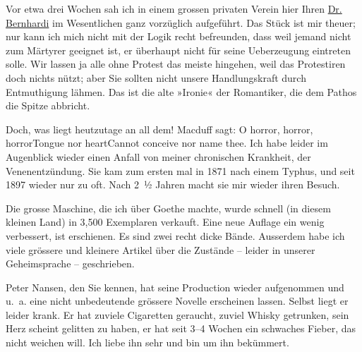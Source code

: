 \pstart
           Vor etwa drei Wochen sah ich in {\pb}einem grossen privaten Verein hier Ihren \uline{Dr. Bernhardi} im Wesentlichen ganz vorzüglich aufgeführt. Das Stück ist mir theuer; nur kann
               ich mich nicht mit der Logik recht befreunden, dass weil jemand nicht zum Märtyrer
               geeignet ist, er überhaupt nicht für seine Ueberzeugung eintreten solle. Wir lassen
               ja alle ohne Protest das meiste hingehen, weil das Protestiren doch nichts nützt;
               aber Sie sollten nicht unsere Handlungskraft durch Entmuthigung lähmen. Das ist die
               alte »Ironie« der Romantiker, die dem Pathos die Spitze abbricht.\pend
           
\pstart
           Doch, was liegt heutzutage an all dem! Macduff sagt:\pend
           \stanza{}O horror, horror, horrorTongue nor heartCannot conceive nor name
                     thee.\stanzaend{}
\pstart
           {\pb}Ich habe leider im Augenblick
               wieder einen Anfall von meiner chronischen Krankheit, der Venenentzündung. Sie kam
               zum ersten mal in 1871 nach einem Typhus, und seit 1897
               wieder nur zu oft. Nach 2 ½ Jahren macht sie mir wieder ihren Besuch.\pend
           
\pstart
           Die grosse Maschine, die ich
               über Goethe machte, wurde schnell (in diesem
               kleinen Land) in 3,500
               Exemplaren verkauft. Eine neue Auflage ein wenig verbessert, ist erschienen. Es sind
               zwei recht dicke Bände. Ausserdem habe ich viele grössere und kleinere Artikel über
               die Zustände – leider in unserer Geheimsprache – geschrieben.\pend
           
\pstart
           Peter Nansen, den Sie kennen, hat seine
               Production wieder aufgenommen und u. a. eine nicht unbedeutende grössere Novelle erscheinen lassen.
               Selbst liegt er leider krank. Er hat zuviele {\pb}Cigaretten geraucht, zuviel Whisky
               getrunken, sein Herz scheint gelitten zu haben, er hat seit 3–4 Wochen ein schwaches Fieber, das nicht weichen will. Ich liebe
               ihn sehr und bin um ihn bekümmert.\pend
           
